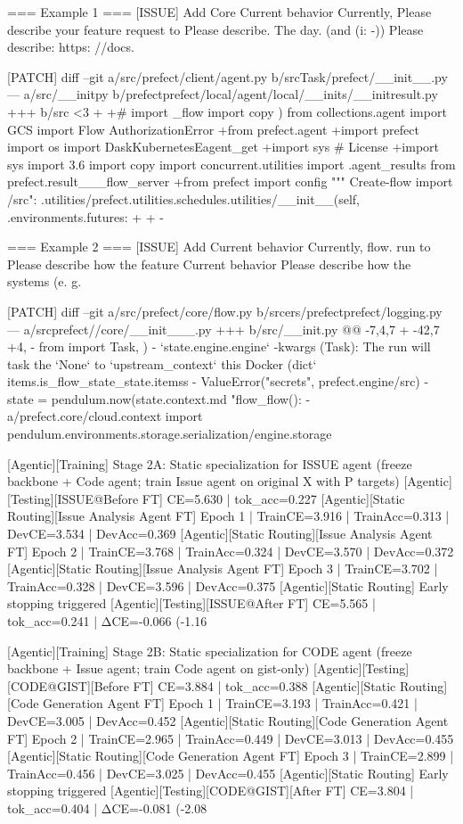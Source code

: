  === Example 1 ===
 [ISSUE]
 Add Core Current behavior Currently, Please describe your feature request to Please describe. The day. (and (i: -)) Please describe: https: //docs.
 
 [PATCH]
 diff --git a/src/prefect/client/agent.py b/srcTask/prefect/__init__.py --- a/src/__initpy b/prefectprefect/local/agent/local/__inits/__initresult.py +++ b/src <3 + +# import _flow import copy ) from collections.agent import GCS import Flow AuthorizationError +from prefect.agent +import prefect import os import DaskKubernetesEagent_get +import sys # License +import sys import 3.6 import copy import concurrent.utilities import .agent_results from prefect.result___flow_server +from prefect import config """ Create-flow import /src": .utilities/prefect.utilities.schedules.utilities/__init__(self, .environments.futures: + + - 
 
 === Example 2 ===
 [ISSUE]
 Add Current behavior Currently, flow. run to Please describe how the feature Current behavior Please describe how the systems (e. g.
 
 [PATCH]
 diff --git a/src/prefect/core/flow.py b/srcers/prefectprefect/logging.py --- a/srcprefect//core/__init___.py +++ b/src/__init.py @@ -7,4,7 + -42,7 +4, - from  import Task, ) - `state.engine.engine` -kwargs (Task): The run will task the `None` to `upstream_context` this Docker (dict` items.is_flow_state_state.itemss - ValueError("secrets", prefect.engine/src) - state = pendulum.now(state.context.md "flow_flow(): - a/prefect.core/cloud.context import pendulum.environments.storage.serialization/engine.storage
 
 [Agentic][Training] Stage 2A: Static specialization for ISSUE agent (freeze backbone + Code agent; train Issue agent on original X with P targets)
 [Agentic][Testing][ISSUE@Before FT] CE=5.630 | tok_acc=0.227
 [Agentic][Static Routing][Issue Analysis Agent FT] Epoch 1 | TrainCE=3.916 | TrainAcc=0.313 | DevCE=3.534 | DevAcc=0.369
 [Agentic][Static Routing][Issue Analysis Agent FT] Epoch 2 | TrainCE=3.768 | TrainAcc=0.324 | DevCE=3.570 | DevAcc=0.372
 [Agentic][Static Routing][Issue Analysis Agent FT] Epoch 3 | TrainCE=3.702 | TrainAcc=0.328 | DevCE=3.596 | DevAcc=0.375
 [Agentic][Static Routing] Early stopping triggered
 [Agentic][Testing][ISSUE@After FT] CE=5.565 | tok_acc=0.241 | ΔCE=-0.066 (-1.16%
 
 [Agentic][Training] Stage 2B: Static specialization for CODE agent (freeze backbone + Issue agent; train Code agent on gist-only)
 [Agentic][Testing][CODE@GIST][Before FT] CE=3.884 | tok_acc=0.388
 [Agentic][Static Routing][Code Generation Agent FT] Epoch 1 | TrainCE=3.193 | TrainAcc=0.421 | DevCE=3.005 | DevAcc=0.452
 [Agentic][Static Routing][Code Generation Agent FT] Epoch 2 | TrainCE=2.965 | TrainAcc=0.449 | DevCE=3.013 | DevAcc=0.455
 [Agentic][Static Routing][Code Generation Agent FT] Epoch 3 | TrainCE=2.899 | TrainAcc=0.456 | DevCE=3.025 | DevAcc=0.455
 [Agentic][Static Routing] Early stopping triggered
 [Agentic][Testing][CODE@GIST][After FT] CE=3.804 | tok_acc=0.404 | ΔCE=-0.081 (-2.08%
 

